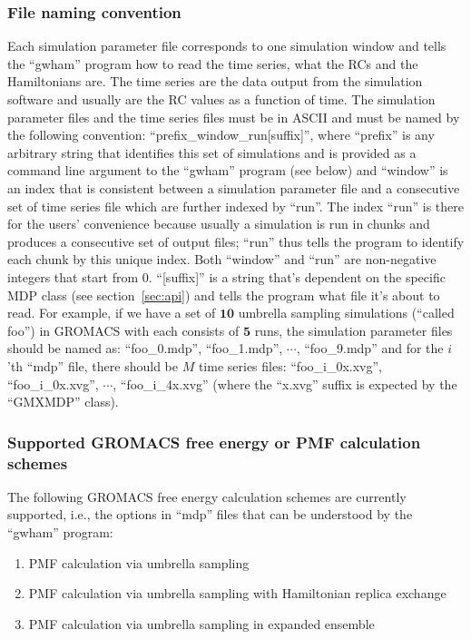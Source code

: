 \subsubsection{File naming convention}\label{sec:fname}
Each simulation parameter file corresponds to one simulation window and tells
the ``gwham'' program how to read the time series, what the RCs and the
Hamiltonians are. The time series are the data output from the simulation
software and usually are the RC values as a function of time. The simulation
parameter files and the time series files must be in ASCII and must be named by
the following convention: ``prefix\_window\_run[suffix]'', where ``prefix'' is
any arbitrary string that identifies this set of simulations and is provided as
a command line argument to the ``gwham'' program (see below) and ``window'' is
an index that is consistent between a simulation parameter file and a
consecutive set of time series file which are further indexed by ``run''. The
index ``run'' is there for the users' convenience because usually a simulation
is run in chunks and produces a consecutive set of output files; ``run'' thus
tells the program to identify each chunk by this unique index. Both ``window''
and ``run'' are non-negative integers that start from 0. ``[suffix]'' is a
string that's dependent on the specific MDP class (see section~\ref{sec:api})
and tells the program what file it's about to read.  For example, if we have a
set of $\mathbf{10}$ umbrella sampling simulations (``called foo'') in GROMACS
with each consists of $\mathbf{5}$ runs, the simulation parameter files should
be named as: ``foo\_0.mdp'', ``foo\_1.mdp'', $\cdots$, ``foo\_9.mdp'' and for
the $i$'th ``mdp'' file, there should be $M$ time series files:
``foo\_i\_0x.xvg'', ``foo\_i\_0x.xvg'', $\cdots$, ``foo\_i\_4x.xvg'' (where the
``x.xvg'' suffix is expected by the ``GMXMDP'' class). 

\subsubsection{Supported GROMACS free energy or PMF calculation schemes}
The following GROMACS free energy calculation schemes are currently supported, i.e., 
the options in ``mdp'' files that can be understood by the ``gwham'' program:

\begin{enumerate}
  \item \label{it:umb} PMF calculation via umbrella sampling 
  \item \label{it:hrex} PMF calculation via umbrella sampling with Hamiltonian replica exchange 
  \item \label{it:expens} PMF calculation via umbrella sampling in expanded ensemble 
\end{enumerate}

